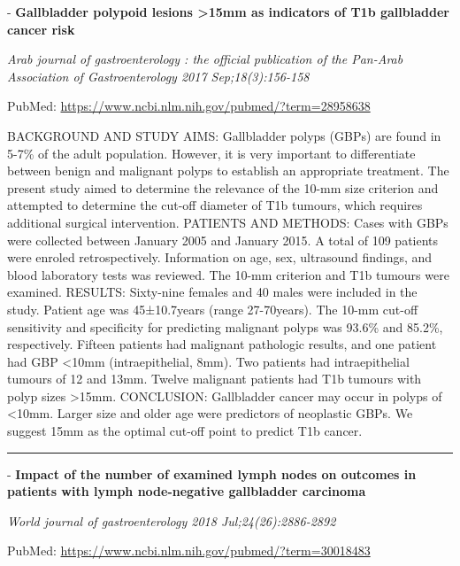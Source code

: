\documentclass[]{article}
\begin{document}
 - \textbf{Gallbladder polypoid lesions \textgreater{}15mm as indicators
of T1b gallbladder cancer risk}

\emph{Arab journal of gastroenterology : the official publication of the
Pan-Arab Association of Gastroenterology 2017 Sep;18(3):156-158}

PubMed: \url{https://www.ncbi.nlm.nih.gov/pubmed/?term=28958638}

BACKGROUND AND STUDY AIMS: Gallbladder polyps (GBPs) are found in 5-7\%
of the adult population. However, it is very important to differentiate
between benign and malignant polyps to establish an appropriate
treatment. The present study aimed to determine the relevance of the
10-mm size criterion and attempted to determine the cut-off diameter of
T1b tumours, which requires additional surgical intervention. PATIENTS
AND METHODS: Cases with GBPs were collected between January 2005 and
January 2015. A total of 109 patients were enroled retrospectively.
Information on age, sex, ultrasound findings, and blood laboratory tests
was reviewed. The 10-mm criterion and T1b tumours were examined.
RESULTS: Sixty-nine females and 40 males were included in the study.
Patient age was 45±10.7years (range 27-70years). The 10-mm cut-off
sensitivity and specificity for predicting malignant polyps was 93.6\%
and 85.2\%, respectively. Fifteen patients had malignant pathologic
results, and one patient had GBP \textless{}10mm (intraepithelial, 8mm).
Two patients had intraepithelial tumours of 12 and 13mm. Twelve
malignant patients had T1b tumours with polyp sizes \textgreater{}15mm.
CONCLUSION: Gallbladder cancer may occur in polyps of \textless{}10mm.
Larger size and older age were predictors of neoplastic GBPs. We suggest
15mm as the optimal cut-off point to predict T1b cancer.

{}

{}

\begin{center}\rule{0.5\linewidth}{\linethickness}\end{center}

 - \textbf{Impact of the number of examined lymph nodes on outcomes in
patients with lymph node-negative gallbladder carcinoma}

\emph{World journal of gastroenterology 2018 Jul;24(26):2886-2892}

PubMed: \url{https://www.ncbi.nlm.nih.gov/pubmed/?term=30018483}
\end{document}
